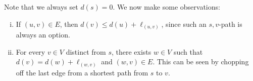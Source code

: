 Note that we always set $d(s) = 0$. We now make some observations: 
\begin{enumerate}[(i)]
    \item If $(u, v) \in E$, then $d(v) \leq d(u) + \ell_{(u,v)}$, since 
    such an $s, v$-path is always an option.
    \item For every $v \in V$ distinct from $s$, there exists $w \in V$ 
    such that $d(v) = d(w) + \ell_{(w, v)}$ and $(w, v) \in E$. This can 
    be seen by chopping off the last edge from a shortest path from $s$ to $v$.
\end{enumerate}
